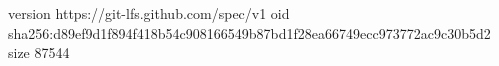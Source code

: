 version https://git-lfs.github.com/spec/v1
oid sha256:d89ef9d1f894f418b54c908166549b87bd1f28ea66749ecc973772ac9c30b5d2
size 87544
